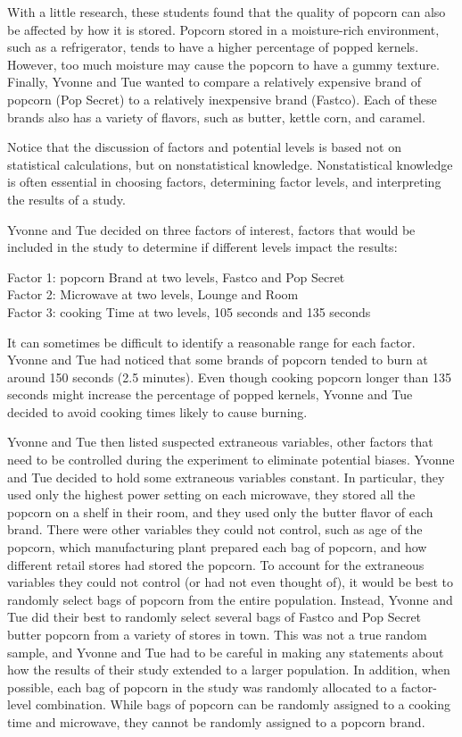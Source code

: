 \documentclass[
]{report}
\begin{document}
With a little research, these students found that the quality of popcorn can also be affected by how it is stored. Popcorn stored in a moisture-rich environment, such as a refrigerator, tends to have a higher percentage of popped kernels. However, too much moisture may cause the popcorn to have a gummy texture. Finally, Yvonne and Tue wanted to compare a relatively expensive brand of popcorn (Pop Secret) to a relatively inexpensive brand (Fastco). Each of these brands also has a variety of flavors, such as butter, kettle corn, and caramel.

Notice that the discussion of factors and potential levels is based not on statistical calculations, but on nonstatistical knowledge. Nonstatistical knowledge is often essential in choosing factors, determining factor levels, and interpreting the results of a study.

Yvonne and Tue decided on three factors of interest, factors that would be included in the study to determine if different levels impact the results:

Factor 1: popcorn Brand at two levels, Fastco and Pop Secret\\
Factor 2: Microwave at two levels, Lounge and Room\\
Factor 3: cooking Time at two levels, 105 seconds and 135 seconds

It can sometimes be difficult to identify a reasonable range for each factor. Yvonne and Tue had noticed that some brands of popcorn tended to burn at around 150 seconds (2.5 minutes). Even though cooking popcorn longer than 135 seconds might increase the percentage of popped kernels, Yvonne and Tue decided to avoid cooking times likely to cause burning.

Yvonne and Tue then listed suspected extraneous variables, other factors that need to be controlled during the experiment to eliminate potential biases. Yvonne and Tue decided to hold some extraneous variables constant. In particular, they used only the highest power setting on each microwave, they stored all the popcorn on a shelf in their room, and they used only the butter flavor of each brand. There were other variables they could not control, such as age of the popcorn, which manufacturing plant prepared each bag of popcorn, and how different retail stores had stored the popcorn. To account for the extraneous variables they could not control (or had not even thought of), it would be best to randomly select bags of popcorn from the entire population. Instead, Yvonne and Tue did their best to randomly select several bags of Fastco and Pop Secret butter popcorn from a variety of stores in town. This was not a true random sample, and Yvonne and Tue had to be careful in making any statements about how the results of their study extended to a larger population. In addition, when possible, each bag of popcorn in the study was randomly allocated to a factor-level combination. While bags of popcorn can be randomly assigned to a cooking time and microwave, they cannot be randomly assigned to a popcorn brand.
\end{document}
